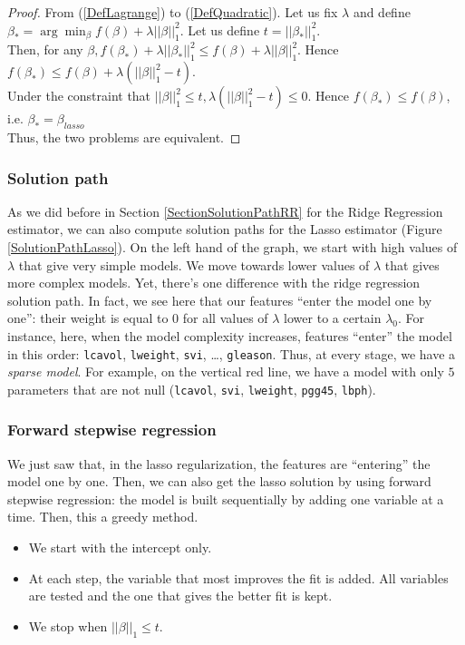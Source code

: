 \documentclass[a4paper,12pt]{article}
\begin{document}
\begin{proof}
From (\ref{DefLagrange}) to (\ref{DefQuadratic}). Let us fix $\lambda$ and define $\beta_*  = \arg \min_\beta f(\beta) + \lambda ||\beta||_1^2$. Let us define $t = ||\beta_*||_1^2.$\\ 
Then, for any $\beta, f(\beta_*)+ \lambda ||\beta_*||_1^2 \leq f(\beta)+\lambda||\beta||_1^2$. Hence $f(\beta_*)\leq f(\beta)+\lambda(||\beta||_1^2 - t).$\\
Under the constraint that $||\beta||_1^2 \leq t, \lambda(||\beta||_1^2 - t) \leq 0$. Hence $f(\beta_*) \leq f(\beta)$, i.e. $\beta_* = \beta_{lasso}$\\

Thus, the two problems are equivalent.
\end{proof}
\subsubsection{Solution path}
As we did before in Section \ref{SectionSolutionPathRR} for the Ridge Regression estimator, we can also compute solution paths for the Lasso estimator (Figure \ref{SolutionPathLasso}). On the left hand of the graph, we start with high values of $\lambda$ that give very simple models. We move towards lower values of $\lambda$ that gives more complex models. Yet, there's one difference with the ridge regression solution path. In fact, we see here that our features ``enter the model one by one'': their weight is equal to $0$ for all values of $\lambda$ lower to a certain $\lambda_0$. For instance, here, when the model complexity increases, features ``enter'' the model in this order: \texttt{lcavol}, \texttt{lweight}, \texttt{svi}, \ldots, \texttt{gleason}. Thus, at every stage, we have a \emph{sparse model}. For example, on the vertical red line, we have a model with only $5$ parameters that are not null (\texttt{lcavol}, \texttt{svi}, \texttt{lweight}, \texttt{pgg45}, \texttt{lbph}).

\subsubsection{Forward stepwise regression}
We just saw that, in the lasso regularization, the features are ``entering'' the model one by one. Then, we can also get the lasso solution by using forward stepwise regression: the model is built sequentially by adding one variable at a time. Then, this a greedy method.
\begin{itemize}
\item We start with the intercept only.
\item At each step, the variable that most improves the fit is added. All variables are tested and the one that gives the better fit is kept.
\item We stop when $||\beta ||_1 \leq t$.
\end{itemize}
\end{document}
